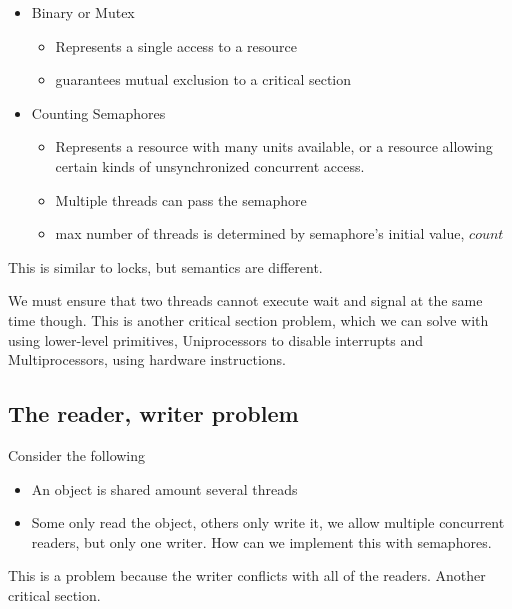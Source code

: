 \documentclass{article}
\begin{document}
\begin{itemize}
  \item Binary or Mutex
  \begin{itemize}
    \item Represents a single access to a resource
    \item guarantees mutual exclusion to a critical section
  \end{itemize}
  \item Counting Semaphores
  \begin{itemize}
    \item Represents a resource with many units available, or a resource allowing certain kinds of unsynchronized concurrent access.
    \item Multiple threads can pass the semaphore
    \item max number of threads is determined by semaphore's initial value, $count$
  \end{itemize}
\end{itemize}

This is similar to locks, but semantics are different.

We must ensure that two threads cannot execute wait and signal at the same time though. This is another critical section problem, which we can solve with using lower-level primitives, Uniprocessors to disable interrupts and Multiprocessors, using hardware instructions.

\subsection{The reader, writer problem}

Consider the following
\begin{itemize}
  \item An object is shared amount several threads
  \item Some only read the object, others only write it, we allow multiple concurrent readers, but only one writer. How can we implement this with semaphores.
\end{itemize}

This is a problem because the writer conflicts with all of the readers. Another critical section.
\end{document}

